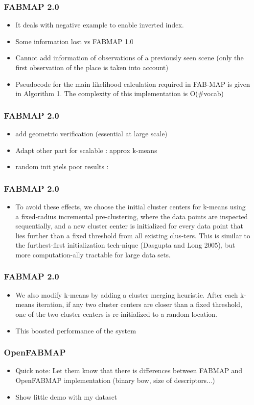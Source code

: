 \begin{frame}
    \frametitle{FABMAP 2.0}
    \begin{itemize}
        \item It deals with negative example to enable inverted index.
        \item Some information lost vs FABMAP 1.0
        \item Cannot add information of observations of a previously seen scene (only the first observation of the place is taken into account)
        \item Pseudocode for the main likelihood calculation required in FAB-MAP is given in Algorithm 1. The complexity of this implementation is O(\#vocab)
    \end{itemize}
\end{frame}

\begin{frame}
    \frametitle{FABMAP 2.0}
    \begin{itemize}
        \item add geometric verification (essential at large scale)
        \item Adapt other part for scalable : approx k-means
        \item random init yiels poor results :
    \end{itemize}
\end{frame}

\begin{frame}
    \frametitle{FABMAP 2.0}
    \begin{itemize}
        \item To avoid these effects, we choose the initial cluster centers for k-means using a fixed-radius incremental pre-clustering, where the data points are inspected sequentially, and a new cluster center is initialized for every data point that lies further than a fixed threshold from all existing clus-ters. This is similar to the furthest-first initialization tech-nique (Dasgupta and Long 2005), but more computation-ally tractable for large data sets. 
    \end{itemize}
\end{frame}

\begin{frame}
    \frametitle{FABMAP 2.0}
    \begin{itemize}
        \item We also modify k-means by adding a cluster merging heuristic. After each k-means iteration, if any two cluster centers are closer than a fixed threshold, one of the two cluster centers is re-initialized to a random location.
        \item This boosted performance of the system
    \end{itemize}
\end{frame}

\begin{frame}
    \frametitle{OpenFABMAP}
    \begin{itemize}
        \item Quick note: Let them know that there is differences between FABMAP and OpenFABMAP implementation (binary bow, size of descriptors...)
        \item Show little demo with my dataset
    \end{itemize}
\end{frame}
